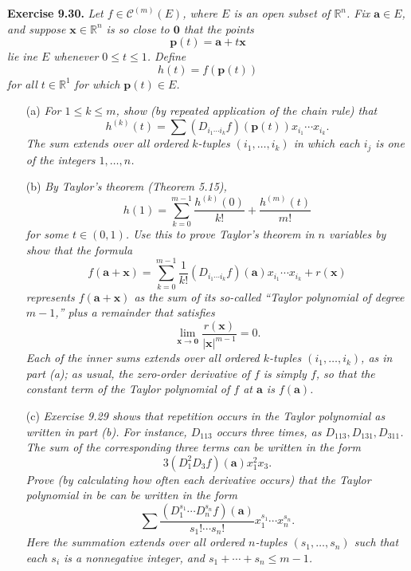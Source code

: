 \documentclass{article}
\begin{document}
\textbf{Exercise 9.30.}
\emph{Let $f \in \mathscr{C}^{(m)}(E)$, where $E$ is an open subset of $\mathbb{R}^n$.
Fix $\mathbf{a} \in E$,
and suppose $\mathbf{x} \in \mathbb{R}^n$ is so close to $\mathbf{0}$ that the points
\[
 \mathbf{p}(t) = \mathbf{a} + t \mathbf{x}
\]
lie ine $E$ whenever $0 \leq t \leq 1$.
Define
\[
  h(t) = f(\mathbf{p}(t))
\]
for all $t \in \mathbb{R}^1$ for which $\mathbf{p}(t) \in E$.}
\begin{enumerate}
\item[(a)]
  \emph{For $1 \leq k \leq m$, show (by repeated application of the chain rule) that
  \[
    h^{(k)}(t) = \sum (D_{i_1 \cdots i_k}f)(\mathbf{p}(t)) x_{i_1} \cdots x_{i_k}.
  \]
  The sum extends over all ordered $k$-tuples
  $(i_1,\ldots,i_k)$
  in which each $i_j$ is one of the integers $1,\ldots,n$.}

\item[(b)]
  \emph{By Taylor's theorem (Theorem 5.15),
  \[
    h(1) = \sum_{k=0}^{m-1} \frac{h^{(k)}(0)}{k!} + \frac{h^{(m)}(t)}{m!}
  \]
  for some $t \in (0,1)$.
  Use this to prove Taylor's theorem in $n$ variables by show that the formula
  \[
    f(\mathbf{a} + \mathbf{x})
    = \sum_{k=0}^{m-1} \frac{1}{k!}(D_{i_1 \cdots i_k}f)(\mathbf{a})x_{i_1} \cdots x_{i_k}
     + r(\mathbf{x})
  \]
  represents $f(\mathbf{a} + \mathbf{x})$ as the sum of its so-called
  ``Taylor polynomial of degree $m-1$,''
  plus a remainder that satisfies
  \[
    \lim_{\mathbf{x} \to \mathbf{0}} \frac{r(\mathbf{x})}{|\mathbf{x}|^{m-1}} = 0.
  \]
  Each of the inner sums extends over all ordered $k$-tuples
  $(i_1,\ldots,i_k)$, as in part (a);
  as usual, the zero-order derivative of $f$ is simply $f$,
  so that the constant term of the Taylor polynomial of $f$ at $\mathbf{a}$ is
  $f(\mathbf{a})$.}

\item[(c)]
  \emph{Exercise 9.29 shows that repetition occurs in the Taylor polynomial
  as written in part (b).
  For instance, $D_{113}$ occurs three times, as $D_{113}, D_{131}, D_{311}$.
  The sum of the corresponding three terms can be written in the form
  \[
    3 (D_1^2 D_3 f)(\mathbf{a})x_1^2 x_3.
  \]
  Prove (by calculating how often each derivative occurs) that the Taylor polynomial
  in be can be written in the form
  \[
    \sum \frac{(D_1^{s_1} \cdots D_n^{s_n}f)(\mathbf{a})}{s_1! \cdots s_n!}
      x_1^{s_1} \cdots x_n^{s_n}.
  \]
  Here the summation extends over all ordered $n$-tuples $(s_1,\ldots,s_n)$
  such that each $s_i$ is a nonnegative integer, and $s_1 + \cdots + s_n \leq m-1$.} \\
\end{enumerate}
\end{document}
